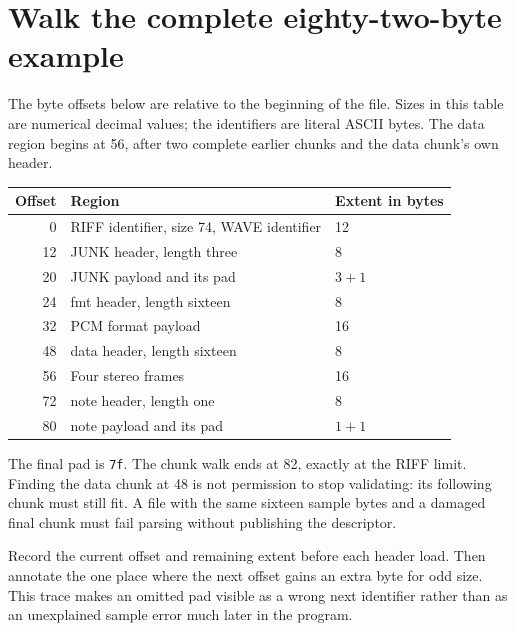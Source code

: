 \section{Walk the complete eighty-two-byte example}
The byte offsets below are relative to the beginning of the file. Sizes in this table
are numerical decimal values; the identifiers are literal ASCII bytes. The data region
begins at 56, after two complete earlier chunks and the data chunk's own header.

\begin{center}
  \begin{tabular}{rll}
    Offset & Region                                    & Extent in bytes \\
    \hline
    0      & RIFF identifier, size 74, WAVE identifier & 12              \\
    12     & JUNK header, length three                 & 8               \\
    20     & JUNK payload and its pad                  & $3+1$           \\
    24     & fmt header, length sixteen                & 8               \\
    32     & PCM format payload                        & 16              \\
    48     & data header, length sixteen               & 8               \\
    56     & Four stereo frames                        & 16              \\
    72     & note header, length one                   & 8               \\
    80     & note payload and its pad                  & $1+1$           \\
  \end{tabular}
\end{center}

The final pad is \texttt{7f}. The chunk walk ends at 82, exactly at the RIFF limit.
Finding the data chunk at 48 is not permission to stop validating: its following chunk
must still fit. A file with the same sixteen sample bytes and a damaged final chunk
must fail parsing without publishing the descriptor.

Record the current offset and remaining extent before each header load. Then annotate
the one place where the next offset gains an extra byte for odd size. This trace makes
an omitted pad visible as a wrong next identifier rather than as an unexplained sample
error much later in the program.
